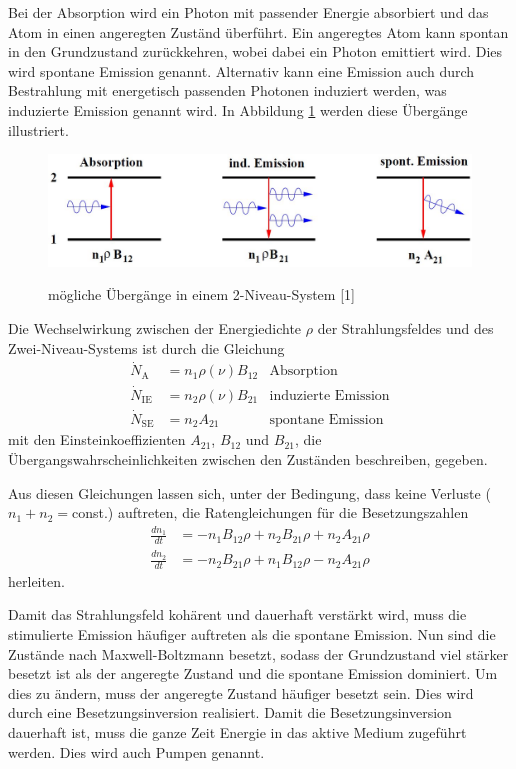 \documentclass[captions=tableheading]{scrartcl}
\begin{document}
Bei der Absorption wird ein Photon mit passender Energie absorbiert und das Atom in einen angeregten Zuständ überführt. 
Ein angeregtes Atom kann spontan in den Grundzustand zurückkehren, wobei dabei ein Photon emittiert wird. Dies wird spontane Emission genannt.
Alternativ kann eine Emission auch durch Bestrahlung mit energetisch passenden Photonen induziert werden, was induzierte Emission genannt wird.
In Abbildung \ref{fig:schema_uebergaenge} werden diese Übergänge illustriert.
\begin{figure}[h]
 \centering
 \includegraphics[width=12cm]{images/schema_uebergaenge.jpg}
 \label{fig:schema_uebergaenge}
 \caption{mögliche Übergänge in einem 2-Niveau-System [1]}
\end{figure}

Die Wechselwirkung zwischen der Energiedichte $\rho$ der Strahlungsfeldes und des Zwei-Niveau-Systems ist durch die Gleichung
\begin{align}
 \dot{N}_\text{A}   & =n_1 \rho\left(\nu \right)B_{12}  &\text{Absorption} \\
 \dot{N}_\text{IE}  & =n_2 \rho\left(\nu \right)B_{21}  &\text{induzierte Emission} \\
 \dot{N}_\text{SE}  & =n_2 A_{21}                       &\text{spontane Emission}
\end{align}
mit den Einsteinkoeffizienten $A_{21}$, $B_{12}$ und $B_{21}$, die Übergangswahrscheinlichkeiten zwischen den Zuständen beschreiben, gegeben.

Aus diesen Gleichungen lassen sich, unter der Bedingung, dass keine Verluste ($n_1+n_2=$const.) auftreten, die Ratengleichungen für die Besetzungszahlen
\begin{align}
 \frac{d n_1}{d t}&=-n_1B_{12}\rho+n_2B_{21}\rho+n_2A_{21}\rho \\
 \frac{d n_2}{d t}&=-n_2B_{21}\rho+n_1B_{12}\rho-n_2A_{21}\rho
\end{align}
herleiten.

Damit das Strahlungsfeld kohärent und dauerhaft verstärkt wird, muss die stimulierte Emission häufiger auftreten als die spontane Emission. 
Nun sind die Zustände nach Maxwell-Boltzmann besetzt, sodass der Grundzustand viel stärker besetzt ist als der angeregte Zustand und die spontane Emission dominiert.
Um dies zu ändern, muss der angeregte Zustand häufiger besetzt sein. Dies wird durch eine Besetzungsinversion realisiert. 
Damit die Besetzungsinversion dauerhaft ist, muss die ganze Zeit Energie in das aktive Medium zugeführt werden. Dies wird auch Pumpen genannt.
\end{document}
